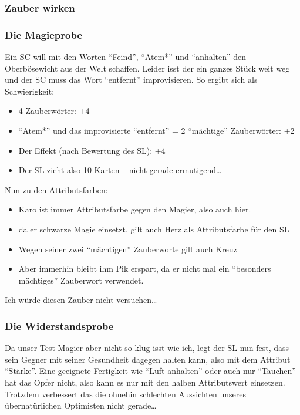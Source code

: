 \subsubsection{Zauber wirken}

\subsubsection{Die Magieprobe}

Ein SC will mit den Worten "`Feind"', "`Atem*"' und "`anhalten"' den Oberbösewicht aus der Welt schaffen. Leider isst der ein ganzes Stück weit weg und der SC muss das Wort "`entfernt"' improvisieren. So ergibt sich als Schwierigkeit:
\begin{itemize}
\item 4 Zauberwörter: +4
\item "`Atem*"' und das improvisierte "`entfernt"' = 2 "`mächtige"' Zauberwörter: +2
\item Der Effekt (nach Bewertung des SL): +4
\item Der SL zieht also 10 Karten -- nicht gerade ermutigend\dots
\end{itemize}
Nun zu den Attributsfarben:
\begin{itemize}
\item Karo ist immer Attributsfarbe gegen den Magier, also auch hier.
\item da er schwarze Magie einsetzt, gilt auch Herz als Attributsfarbe für den SL
\item Wegen seiner zwei "`mächtigen"' Zauberworte gilt auch Kreuz
\item Aber immerhin bleibt ihm Pik erspart, da er nicht mal ein "`besonders mächtiges"' Zauberwort verwendet.
\end{itemize}
Ich würde diesen Zauber nicht versuchen\dots

\subsubsection{Die Widerstandsprobe}

Da unser Test-Magier aber nicht so klug isst wie ich, legt der SL nun fest, dass sein Gegner mit seiner Gesundheit dagegen halten kann, also mit dem Attribut "`Stärke"'. Eine geeignete Fertigkeit wie "`Luft anhalten"' oder auch nur "`Tauchen"' hat das Opfer nicht, also kann es nur mit den halben Attributswert einsetzen.
Trotzdem verbessert das die ohnehin schlechten Aussichten unseres übernatürlichen Optimisten nicht gerade\dots

